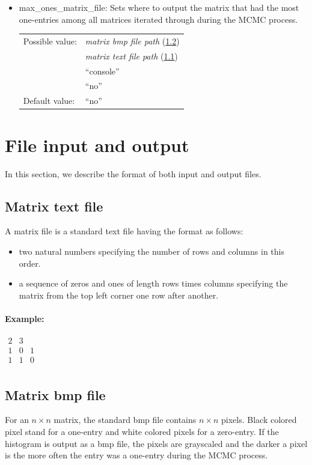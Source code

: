 \begin{itemize}
\item max\_ones\_matrix\_file: Sets where to output the matrix that had the most one-entries among all matrices iterated through during the MCMC process.

\begin{tabular}{ll}
Possible value: & \textit{matrix bmp file path} (\ref{mbf}) \\
& \textit{matrix text file path} (\ref{mtf}) \\
& ``console'' \\
& ``no'' \\
Default value: & ``no''
\end{tabular}

\end{itemize}
\section{File input and output}
In this section, we describe the format of both input and output files.

\subsection{Matrix text file}
\label{mtf}
A matrix file is a standard text file having the format as follows:
\begin{itemize}
\item two natural numbers specifying the number of rows and columns in this order.
\item a sequence of zeros and ones of length rows times columns specifying the matrix from the top left corner one row after another.
\end{itemize}
\paragraph{Example:}
$\begin{array}{ccc}
2 & 3 & \\
1 & 0 & 1 \\
1 & 1 & 0 \\
\end{array}$

\subsection{Matrix bmp file}
\label{mbf}
For an $n\times n$ matrix, the standard bmp file contains $n\times n$ pixels. Black colored pixel stand for a one-entry and white colored pixels for a zero-entry. If the histogram is output as a bmp file, the pixels are grayscaled and the darker a pixel is the more often the entry was a one-entry during the MCMC process.

